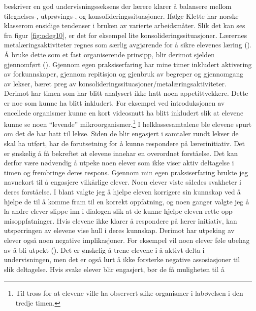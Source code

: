 \documentclass[main.tex]{subfiles}
\begin{document}
 beskriver en god undervisningsseksens der lærere klarer å balansere mellom 
tilegnelses-, utprøvings-, og konsolideringssituasjoner. Ifølge Klette har norske klasserom ensidige 
tendenser i bruken av varierte arbeidsmåter. Slik det kan ses fra figur \ref{fig:odeg10}, er det for 
eksempel lite konsolideringssituasjoner. Lærernes metalæringsaktiviteter regnes som særlig 
avgjørende for å sikre elevenes læring (). Å bruke dette som et fast
organiserende prinsipp, blir derimot sjelden gjennomført (). Gjennom egen praksiserfaring
har mine timer inkludert aktivering av forkunnskaper, gjennom repitisjon og gjenbruk av begreper 
og gjennomgang av lekser, bæret preg av konsolideringssituasjoner/metalæringsaktiviteter. Derimot
har timen som har blitt analysert ikke hatt noen appetittvekkere. Dette er noe som kunne ha blitt 
inkludert. For eksempel ved introduksjonen av encellede organismer kunne en kort videosnutt ha blitt
inkludert slik at elevene kunne se noen ``levende'' mikroorganismer.\footnote[4]{Til tross for at 
elevene ville ha observert slike organismer i labøvelsen i den tredje timen.}  
\newline
\newline
I helklassesamtalene ble elevene spurt om det de har hatt til lekse.
Siden de blir engasjert i samtaler rundt lekser de skal ha utført, har de forutsetning for å kunne 
respondere på lærerinitiativ. Det er ønskelig å få bekreftet at elevene innehar en overordnet 
forståelse. Det kan derfor være nødvendig å utpeke noen elever som ikke viser aktiv deltagelse i 
timen og frembringe deres respons. Gjennom min egen praksiserfaring brukte jeg navnekort
til å engasjere vilkårlige elever. Noen elever viste således svakheter i deres forståelse.
I blant valgte jeg å hjelpe eleven korrigere sin kunnskap ved å hjelpe de til å komme
fram til en korrekt oppfatning, og noen ganger valgte jeg å la andre elever slippe inn i dialogen
slik at de kunne hjelpe eleven rette opp misoppfatninger.
\newline
\newline
Hvis elevene ikke klarer å respondere på lærer initiativ, kan utspørringen av elevene vise hull 
i deres kunnskap. Derimot har utpeking av elever også noen negative implikasjoner. For eksempel 
vil noen elever føle ubehag av å bli utpekt (). Det er ønskelig å trene 
elevene i å aktivt delta i undervisningen, men det er også lurt å ikke forsterke negative 
assosiasjoner til slik deltagelse. Hvis svake elever blir engasjert, bør de få muligheten til å 
\end{document}
